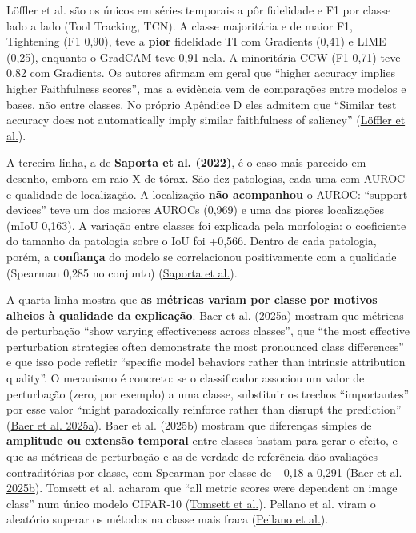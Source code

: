 \documentclass[11pt,a4paper]{article}
\begin{document}
Löffler et al. são os únicos em séries temporais a pôr fidelidade e F1 por classe lado a lado (Tool Tracking, TCN). A classe majoritária e de maior F1, Tightening (F1 0,90), teve a \textbf{pior} fidelidade TI com Gradients (0,41) e LIME (0,25), enquanto o GradCAM teve 0,91 nela. A minoritária CCW (F1 0,71) teve 0,82 com Gradients. Os autores afirmam em geral que ``higher accuracy implies higher Faithfulness scores'', mas a evidência vem de comparações entre modelos e bases, não entre classes. No próprio Apêndice D eles admitem que ``Similar test accuracy does not automatically imply similar faithfulness of saliency'' (\href{https://arxiv.org/abs/2203.07861}{Löffler et al.}).

A terceira linha, a de \textbf{Saporta et al. (2022)}, é o caso mais parecido em desenho, embora em raio X de tórax. São dez patologias, cada uma com AUROC e qualidade de localização. A localização \textbf{não acompanhou} o AUROC: ``support devices'' teve um dos maiores AUROCs (0,969) e uma das piores localizações (mIoU 0,163). A variação entre classes foi explicada pela morfologia: o coeficiente do tamanho da patologia sobre o IoU foi +0,566. Dentro de cada patologia, porém, a \textbf{confiança} do modelo se correlacionou positivamente com a qualidade (Spearman 0,285 no conjunto) (\href{https://asaporta.github.io/assets/pdf/chexlocalize.pdf}{Saporta et al.}).

A quarta linha mostra que \textbf{as métricas variam por classe por motivos alheios à qualidade da explicação}. Baer et al. (2025a) mostram que métricas de perturbação ``show varying effectiveness across classes'', que ``the most effective perturbation strategies often demonstrate the most pronounced class differences'' e que isso pode refletir ``specific model behaviors rather than intrinsic attribution quality''. O mecanismo é concreto: se o classificador associou um valor de perturbação (zero, por exemplo) a uma classe, substituir os trechos ``importantes'' por esse valor ``might paradoxically reinforce rather than disrupt the prediction'' (\href{https://arxiv.org/abs/2502.17022}{Baer et al. 2025a}). Baer et al. (2025b) mostram que diferenças simples de \textbf{amplitude ou extensão temporal} entre classes bastam para gerar o efeito, e que as métricas de perturbação e as de verdade de referência dão avaliações contraditórias por classe, com Spearman por classe de −0,18 a 0,291 (\href{https://arxiv.org/abs/2506.11790}{Baer et al. 2025b}). Tomsett et al. acharam que ``all metric scores were dependent on image class'' num único modelo CIFAR-10 (\href{https://arxiv.org/abs/1912.01451}{Tomsett et al.}). Pellano et al. viram o aleatório superar os métodos na classe mais fraca (\href{https://arxiv.org/pdf/2402.12790}{Pellano et al.}).
\end{document}
